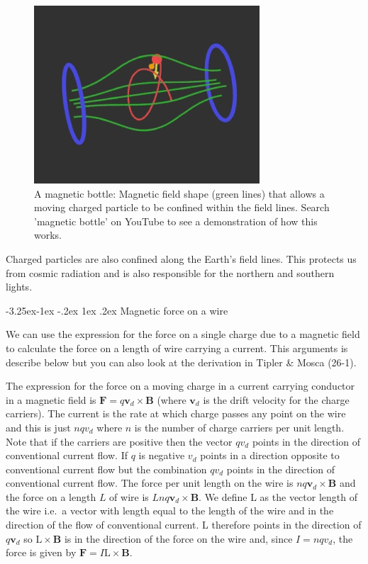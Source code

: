 \documentclass[
]{book}
\makeatletter
\renewcommand\subsection{%
\@startsection{subsection}{2}{\z@}%
              {-3.25ex\@plus -1ex \@minus -.2ex}%
              {1ex \@plus .2ex}%
              {\sffamily\bfseries}}
\numberwithin{equation}{section}
\makeatother
\begin{document}
\begin{figure}

{\centering \includegraphics[width=0.7\linewidth]{Figures/magBottle} 

}

\caption{A magnetic bottle: Magnetic field shape (green lines) that allows a moving charged particle to be confined within the field lines. Search 'magnetic bottle' on YouTube to see a demonstration of how this works.}\label{fig:magBottle}
\end{figure}

Charged particles are also confined along the Earth's field lines. This
protects us from cosmic radiation and is also responsible for the
northern and southern lights.

\hypertarget{magnetic-force-on-a-wire}{%
\subsection{Magnetic force on a wire}\label{magnetic-force-on-a-wire}}

We can use the expression for the force on a single charge due to a
magnetic field to calculate the force on a length of wire carrying a
current. This arguments is describe below but you can also look at the
derivation in Tipler \& Mosca (26-1).

The expression for the force on a moving charge in a current carrying
conductor in a magnetic field is \(\mathbf{F} = q\mathbf{v}_d \times \mathbf{B}\) (where \(\mathbf{v}_d\) is
the drift velocity for the charge carriers). The current is the rate at
which charge passes any point on the wire and this is just \(nqv_d\) where
\(n\) is the number of charge carriers per unit length. Note that if the
carriers are positive then the vector \(qv_d\) points in the direction of
conventional current flow. If \(q\) is negative \(v_d\) points in a
direction opposite to conventional current flow but the combination
\(qv_d\) points in the direction of conventional current flow. The force
per unit length on the wire is \(nq \mathbf{v}_d \times \mathbf{B}\) and the force on a
length \(L\) of wire is \(Lnq \mathbf{v}_d \times \mathbf{B}\). We define \(\mathrm{L}\) as the vector
length of the wire i.e.~a vector with length equal to the length of the
wire and in the direction of the flow of conventional current. \(\mathrm{L}\)
therefore points in the direction of \(q \mathbf{v}_d\) so \(\mathrm{L} \times \mathbf{B}\) is in
the direction of the force on the wire and, since \(I = nq v_d\), the
force is given by \(\mathbf{F} = I \mathrm{L} \times \mathbf{B}\).
\end{document}

